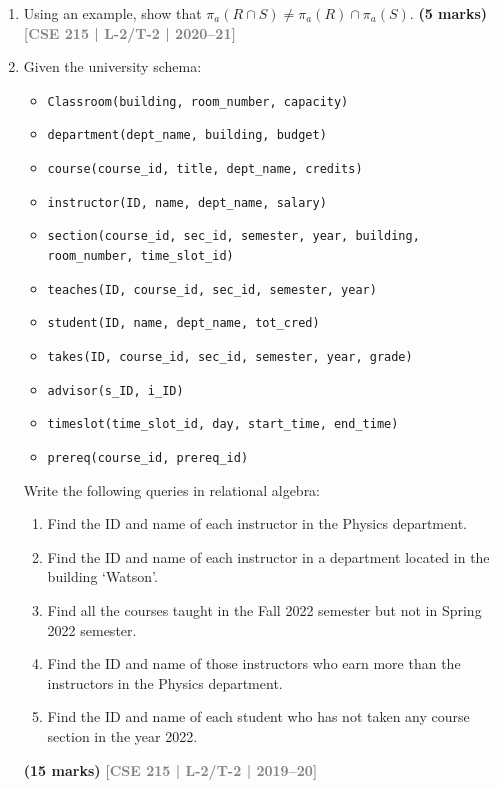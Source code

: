 \documentclass[12pt]{article}
\newcommand{\yr}[1]{\hfill\textcolor{gray}{\small\textbf{[#1]}}}
\newcommand{\mk}[1]{\textcolor{orange!70!black}{\small\textbf{(#1 marks)}}}
\begin{document}
\begin{enumerate}
\item Using an example, show that $\pi_a(R \cap S) \neq \pi_a(R) \cap \pi_a(S)$.
\mk{5} \yr{CSE 215 | L-2/T-2 | 2020--21}


\item Given the university schema: 
\begin{itemize}
    \item \texttt{Classroom(building, room\_number, capacity)}
    \item \texttt{department(dept\_name, building, budget)}
    \item \texttt{course(course\_id, title, dept\_name, credits)}
    \item \texttt{instructor(ID, name, dept\_name, salary)}
    \item \texttt{section(course\_id, sec\_id, semester, year, building, room\_number, time\_slot\_id)}
    \item \texttt{teaches(ID, course\_id, sec\_id, semester, year)}
    \item \texttt{student(ID, name, dept\_name, tot\_cred)}
    \item \texttt{takes(ID, course\_id, sec\_id, semester, year, grade)}
    \item \texttt{advisor(s\_ID, i\_ID)}
    \item \texttt{timeslot(time\_slot\_id, day, start\_time, end\_time)}
    \item \texttt{prereq(course\_id, prereq\_id)}
\end{itemize}
Write the following queries in relational algebra:
\begin{enumerate}
  \item Find the ID and name of each instructor in the Physics department.
  \item Find the ID and name of each instructor in a department located in the building `Watson'.
  \item Find all the courses taught in the Fall 2022 semester but not in Spring 2022 semester.
  \item Find the ID and name of those instructors who earn more than the instructors in the Physics department.
  \item Find the ID and name of each student who has not taken any course section in the year 2022.
\end{enumerate}
\mk{15} \yr{CSE 215 | L-2/T-2 | 2019--20}



\end{enumerate}
\end{document}
